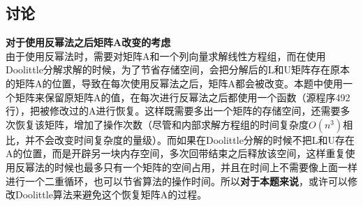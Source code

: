 \documentclass{ctexart}
\begin{document}
\begin{spacing}{1.8}
\section{讨论}
\textbf{对于使用反幂法之后矩阵A改变的考虑}\\
由于使用反幂法时，需要对矩阵A和一个列向量求解线性方程组，而在使用Doolittle分解求解的时候，为了节省存储空间，会把分解后的L和U矩阵存在原本的矩阵A的位置，导致在每次使用反幂法之后，矩阵A都会被改变。本题中使用一个矩阵来保留原矩阵A的值，在每次进行反幂法之后都使用一个函数（源程序492行），把被修改过的A进行恢复。这样既需要多出一个矩阵的存储空间，还需要多次恢复该矩阵，增加了操作次数（尽管和内部求解方程组的时间复杂度$O(n^3)$相比，并不会改变时间复杂度的量级）。而如果在Doolittle分解的时候不把L和U存在A的位置，而是开辟另一块内存空间，多次回带结束之后释放该空间，这样重复使用反幂法的时候也最多只有一个矩阵的空间占用，并且在时间上不需要像上面一样进行一个二重循环，也可以节省算法的操作时间。所以\textbf{对于本题来说}，或许可以修改Doolittle算法来避免这个恢复矩阵A的过程。

\end{spacing}
\end{document}
